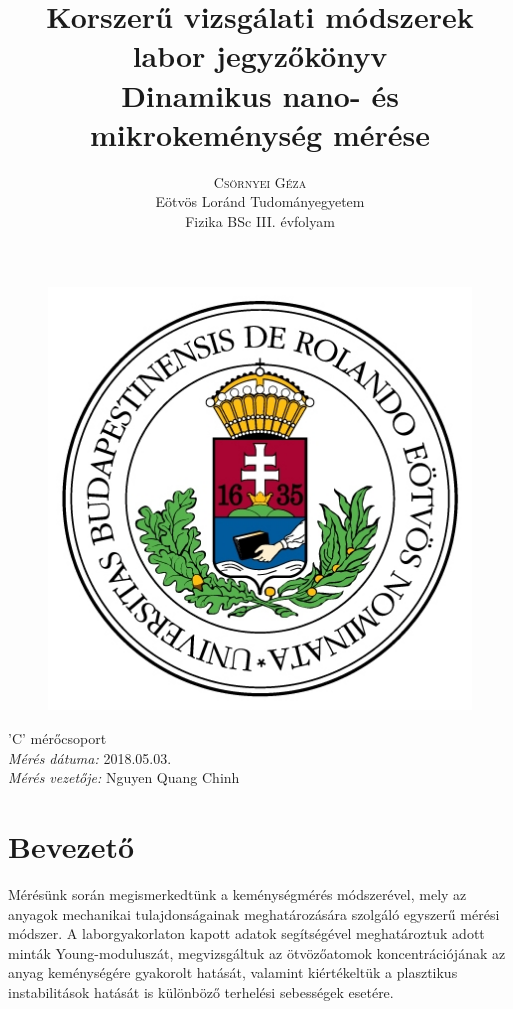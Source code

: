 \documentclass[12pt,a4paper]{article}
\title{\huge{Korszerű vizsgálati módszerek labor jegyzőkönyv}\\ \vspace{20pt}
\textbf{Dinamikus nano- és mikrokeménység mérése}}
\author{\Large{\textsc{Csörnyei Géza}} \vspace{10pt}\\
	\textrm{Eötvös Loránd Tudományegyetem}\\
	\textrm{Fizika BSc III. évfolyam}
	}
\date{}
\begin{document}
\addtolength{\voffset}{-1.0cm}
\addtolength{\textheight}{1.0cm}
\begin{titlepage}
\maketitle

\begin{figure}[!htb]
\centering
\includegraphics[scale=0.6]{eltecimer.jpg}
\end{figure}

\hfil \Large{'C' mérőcsoport}\hfil  \\
\vspace*{2pt}
\hfil \Large{\emph{Mérés dátuma:} 2018.05.03.}\hfil \\
\vspace*{2pt}
\hfil \hspace*{45pt} \Large{\emph{Mérés vezetője:} Nguyen Quang Chinh}\hfil
\thispagestyle{empty}
\end{titlepage}

\section{Bevezető}
\hspace*{10pt} Mérésünk során megismerkedtünk a keménységmérés módszerével, mely az anyagok mechanikai tulajdonságainak meghatározására szolgáló egyszerű mérési módszer. A laborgyakorlaton kapott adatok segítségével meghatároztuk adott minták Young-moduluszát, megvizsgáltuk az ötvözőatomok koncentrációjának az anyag keménységére gyakorolt hatását, valamint kiértékeltük a plasztikus instabilitások hatását is különböző terhelési sebességek esetére.
\end{document}
